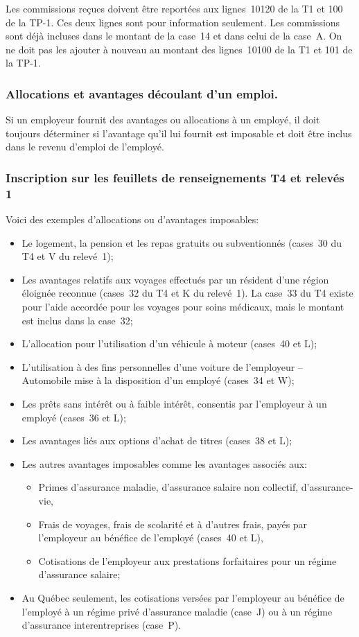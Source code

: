 Les commissions reçues doivent être reportées aux lignes~10120 de la T1 et 100 de la TP-1. Ces deux lignes sont pour information seulement.
Les commissions sont déjà incluses dans le montant de la case~14 et dans celui de la case~A. On ne doit pas les ajouter à nouveau au montant des lignes~10100 de la T1 et 101 de la TP-1. 

\subsubsection{Allocations et avantages découlant d'un emploi.}
Si un employeur fournit des avantages ou allocations à un employé, il doit toujours déterminer si l'avantage qu'il lui fournit est imposable et doit être inclus dans le revenu d'emploi de l'employé.

\subsubsection{Inscription sur les feuillets de renseignements T4 et relevés 1}
Voici des exemples d'allocations ou d'avantages imposables:
\begin{itemize}
	\item Le logement, la pension et les repas gratuits ou subventionnés (cases~30 du T4 et V du relevé~1);
	\item Les avantages relatifs aux voyages effectués par un résident d'une région éloignée reconnue (cases~32 du T4 et K du relevé~1). La case~33 du T4 existe pour l'aide accordée pour les voyages pour soins médicaux, mais le montant est inclus dans la case~32;
	\item L'allocation pour l'utilisation d'un véhicule à moteur (cases~40 et L);
	\item L'utilisation à des fins personnelles d'une voiture de l'employeur – Automobile mise à la disposition d'un employé (cases~34 et W);
	\item Les prêts sans intérêt ou à faible intérêt, consentis par l'employeur à un employé (cases~36 et L);
	\item Les avantages liés aux options d'achat de titres (cases~38 et L);
	\item Les autres avantages imposables comme les avantages associés aux:
	\begin{itemize}
		\item Primes d'assurance maladie, d'assurance salaire non collectif, d'assurance-vie,
		\item Frais de voyages, frais de scolarité et à d'autres frais, payés par l'employeur au bénéfice de l'employé (cases~40 et L),
		\item Cotisations de l'employeur aux prestations forfaitaires pour un régime d'assurance salaire;
	\end{itemize}
	\item Au Québec seulement, les cotisations versées par l'employeur au bénéfice de l'employé à un régime privé d'assurance maladie (case~J) ou à un régime d'assurance interentreprises (case~P).
\end{itemize}
